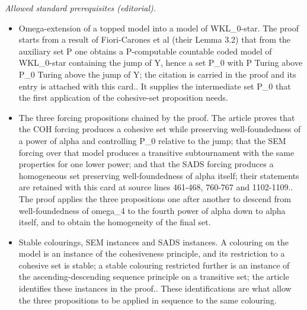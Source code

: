 \documentclass{article}
\numberwithin{theorem}{section}
\newtheorem{proposition}[theorem]{Proposition}
\newcommand{\RCA}{\mathsf{RCA}}
\newcommand{\BSig}{\mathsf{B}\Sigma^0}
\newcommand{\WF}{\mathsf{WF}}
\newcommand{\M}{\mathcal{M}}
\begin{document}
\noindent\textit{Allowed standard prerequisites (editorial).}\begin{itemize}
\item Omega-extension of a topped model into a model of WKL\_0-star. The proof starts from a result of Fiori-Carones et al (their Lemma 3.2) that from the auxiliary set P one obtains a P-computable countable coded model of WKL\_0-star containing the jump of Y, hence a set P\_0 with P Turing above P\_0 Turing above the jump of Y; the citation is carried in the proof and its entry is attached with this card.. It supplies the intermediate set P\_0 that the first application of the cohesive-set proposition needs.
\item The three forcing propositions chained by the proof. The article proves that the COH forcing produces a cohesive set while preserving well-foundedness of a power of alpha and controlling P\_0 relative to the jump; that the SEM forcing over that model produces a transitive subtournament with the same properties for one lower power; and that the SADS forcing produces a homogeneous set preserving well-foundedness of alpha itself; their statements are retained with this card at source lines 461-468, 760-767 and 1102-1109.. The proof applies the three propositions one after another to descend from well-foundedness of omega\_4 to the fourth power of alpha down to alpha itself, and to obtain the homogeneity of the final set.
\item Stable colourings, SEM instances and SADS instances. A colouring on the model is an instance of the cohesiveness principle, and its restriction to a cohesive set is stable; a stable colouring restricted further is an instance of the ascending-descending sequence principle on a transitive set; the article identifies these instances in the proof.. These identifications are what allow the three propositions to be applied in sequence to the same colouring.
\end{itemize}\medskip
{}
\end{document}

